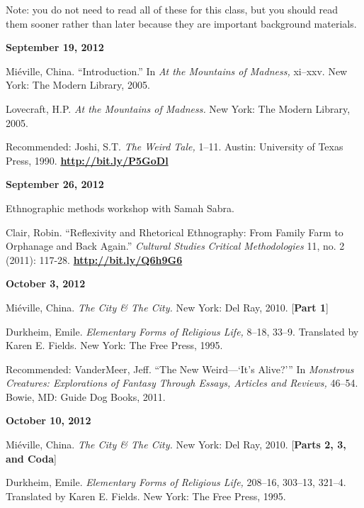 \documentclass[12pt]{article}
\begin{document}
Note: you do not need to read all of these for this class, but you should read them sooner rather than later because they are important background materials.

\textbf{September 19, 2012}

\begin{hangparas}{.5in}{1}
Mi\'eville, China. ``Introduction.'' In \textit{At the Mountains of Madness,} xi--xxv. New York: The Modern Library, 2005.

Lovecraft, H.P. \textit{At the Mountains of Madness.} New York: The Modern Library, 2005.

Recommended: Joshi, S.T. \textit{The Weird Tale,} 1--11. Austin: University of Texas Press, 1990. \href{http://bit.ly/P5GoDl}{\textbf{http://bit.ly/P5GoDl}}
\end{hangparas}

\textbf{September 26, 2012}

Ethnographic methods workshop with Samah Sabra. 

\begin{hangparas}{.5in}{1}
Clair, Robin. ``Reflexivity and Rhetorical Ethnography: From Family Farm to Orphanage and Back Again.'' \textit{Cultural Studies}  \textit{Critical Methodologies} 11, no. 2 (2011): 117-28. \href{http://bit.ly/Q6h9G6}{\textbf{http://bit.ly/Q6h9G6}}
\end{hangparas}

\textbf{October 3, 2012}

\begin{hangparas}{.5in}{1}
Mi\'eville, China. \textit{The City \& The City.} New York: Del Ray, 2010. [\textbf{Part 1}]

Durkheim, Emile. \textit{Elementary Forms of Religious Life,} 8--18, 33--9. Translated by Karen E. Fields. New York: The Free Press, 1995.

Recommended: VanderMeer, Jeff. ``The New Weird---`It's Alive?''' In \textit{Monstrous Creatures: Explorations of Fantasy Through Essays, Articles and Reviews,} 46--54. Bowie, MD: Guide Dog Books, 2011.
\end{hangparas}

\textbf{October 10, 2012}

\begin{hangparas}{.5in}{1}
Mi\'eville, China. \textit{The City \& The City.} New York: Del Ray, 2010. [\textbf{Parts 2, 3, and Coda}]

Durkheim, Emile. \textit{Elementary Forms of Religious Life,} 208--16, 303--13, 321--4. Translated by Karen E. Fields. New York: The Free Press, 1995.
\end{hangparas}
\end{document}
